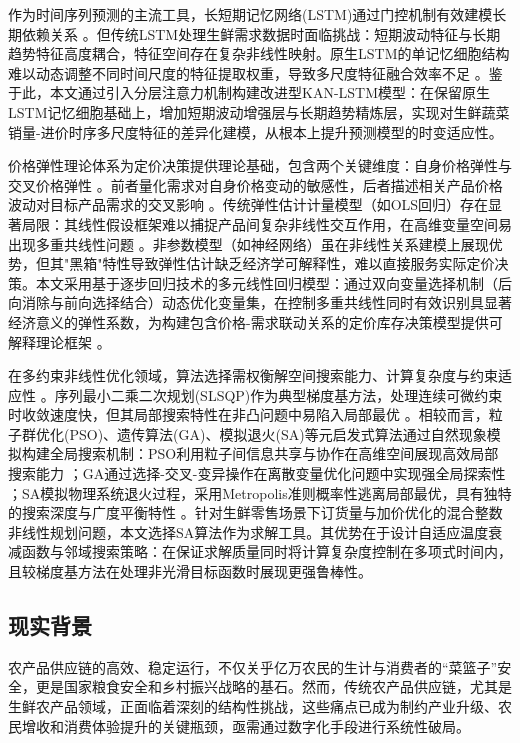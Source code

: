 \documentclass[lang=cn,12pt,a4paper]{elegantpaper}
\begin{document}
作为时间序列预测的主流工具，长短期记忆网络(LSTM)通过门控机制有效建模长期依赖关系 \citep{Hochreiter1997}。但传统LSTM处理生鲜需求数据时面临挑战：短期波动特征与长期趋势特征高度耦合，特征空间存在复杂非线性映射。原生LSTM的单记忆细胞结构难以动态调整不同时间尺度的特征提取权重，导致多尺度特征融合效率不足 \citep{Chien2021}。鉴于此，本文通过引入分层注意力机制构建改进型KAN-LSTM模型：在保留原生LSTM记忆细胞基础上，增加短期波动增强层与长期趋势精炼层，实现对生鲜蔬菜销量-进价时序多尺度特征的差异化建模，从根本上提升预测模型的时变适应性。

价格弹性理论体系为定价决策提供理论基础，包含两个关键维度：自身价格弹性与交叉价格弹性 \citep{Ellison2009}。前者量化需求对自身价格变动的敏感性，后者描述相关产品价格波动对目标产品需求的交叉影响 \citep{Chen2023,Mantrala2006}。传统弹性估计计量模型（如OLS回归）存在显著局限：其线性假设框架难以捕捉产品间复杂非线性交互作用，在高维变量空间易出现多重共线性问题 \citep{Bell2019,Rushchitsky2016}。非参数模型（如神经网络）虽在非线性关系建模上展现优势，但其"黑箱"特性导致弹性估计缺乏经济学可解释性，难以直接服务实际定价决策。本文采用基于逐步回归技术的多元线性回归模型：通过双向变量选择机制（后向消除与前向选择结合）动态优化变量集，在控制多重共线性同时有效识别具显著经济意义的弹性系数，为构建包含价格-需求联动关系的定价库存决策模型提供可解释理论框架 \citep{Kamakura1996,Walters1996}。

在多约束非线性优化领域，算法选择需权衡解空间搜索能力、计算复杂度与约束适应性 \citep{Belkourchia2019}。序列最小二乘二次规划(SLSQP)作为典型梯度基方法，处理连续可微约束时收敛速度快，但其局部搜索特性在非凸问题中易陷入局部最优 \citep{Gad2022a}。相较而言，粒子群优化(PSO)、遗传算法(GA)、模拟退火(SA)等元启发式算法通过自然现象模拟构建全局搜索机制：PSO利用粒子间信息共享与协作在高维空间展现高效局部搜索能力 \citep{Gad2022b}；GA通过选择-交叉-变异操作在离散变量优化问题中实现强全局探索性 \citep{Mangla2021}；SA模拟物理系统退火过程，采用Metropolis准则概率性逃离局部最优，具有独特的搜索深度与广度平衡特性 \citep{Yunzhu2023a}。针对生鲜零售场景下订货量与加价优化的混合整数非线性规划问题，本文选择SA算法作为求解工具。其优势在于设计自适应温度衰减函数与邻域搜索策略：在保证求解质量同时将计算复杂度控制在多项式时间内，且较梯度基方法在处理非光滑目标函数时展现更强鲁棒性。
\subsection{现实背景}
\label{subsec:real_background}
农产品供应链的高效、稳定运行，不仅关乎亿万农民的生计与消费者的“菜篮子”安全，更是国家粮食安全和乡村振兴战略的基石。然而，传统农产品供应链，尤其是生鲜农产品领域，正面临着深刻的结构性挑战，这些痛点已成为制约产业升级、农民增收和消费体验提升的关键瓶颈，亟需通过数字化手段进行系统性破局。
\end{document}
